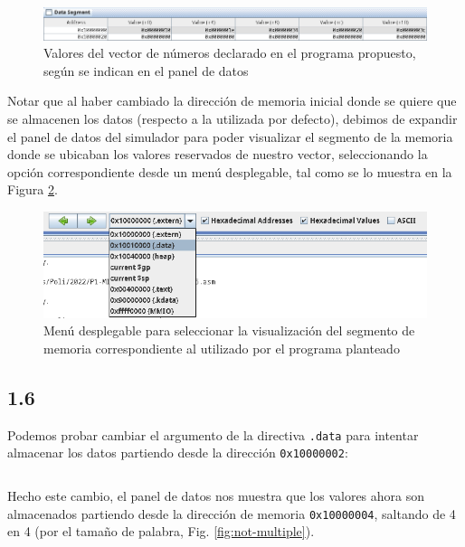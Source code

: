 \documentclass[a4paper]{report}
\begin{document}
\begin{figure}[h]
    \centering
    \captionsetup{justification = centering}
    \includegraphics[width=.95\linewidth]{img/c1-5a}
    \caption{Valores del vector de números declarado en el programa propuesto, según se indican en el panel de datos}
    \label{fig:arr5-mem}
\end{figure}

Notar que al haber cambiado la dirección de memoria inicial donde se quiere que se almacenen los datos (respecto a la utilizada por defecto), debimos de expandir el panel de datos del simulador para poder visualizar el segmento de la memoria donde se ubicaban los valores reservados de nuestro vector, seleccionando la opción correspondiente desde un menú desplegable, tal como se lo muestra en la Figura \ref{fig:dropdown-data}.


\begin{figure}[h]
    \centering
    \captionsetup{justification = centering}
    \includegraphics[width=.7\linewidth]{img/c1-5b}
    \caption{Menú desplegable para seleccionar la visualización del segmento de memoria correspondiente al utilizado por el programa planteado}
    \label{fig:dropdown-data}
\end{figure}

\subsection*{1.6}
\label{sec:c1-6}

Podemos probar cambiar el argumento de la directiva \texttt{.data} para intentar almacenar los datos partiendo desde la dirección \texttt{0x10000002}:

\vspace{7pt}
\inputminted[linenos]{mips}{src/cuestiones/c1-6.asm}
\vspace{7pt}

Hecho este cambio, el panel de datos nos muestra que los valores ahora son almacenados partiendo desde la dirección de memoria \texttt{0x10000004}, saltando de 4 en 4 (por el tamaño de palabra, Fig. \ref{fig:not-multiple}).
\end{document}
